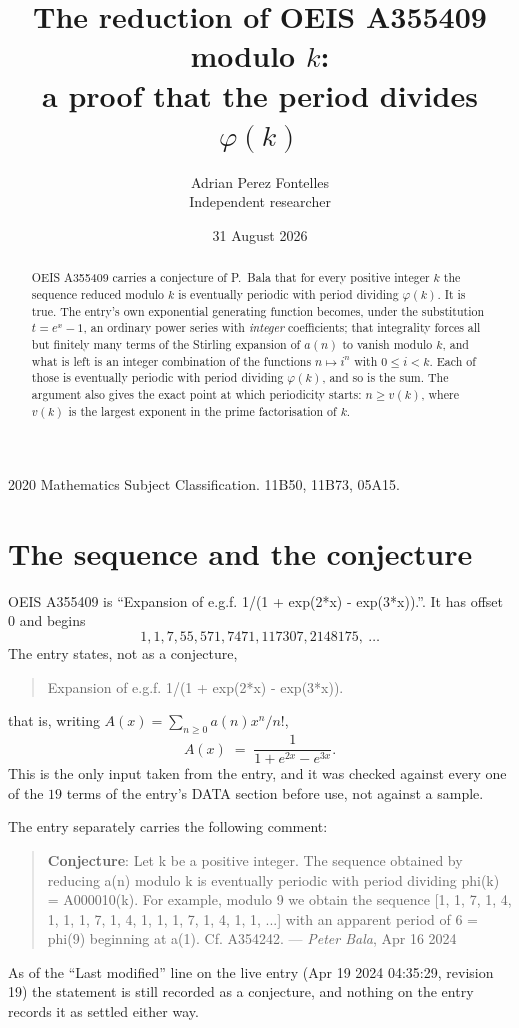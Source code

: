 \documentclass[11pt,a4paper]{article}
\title{The reduction of OEIS A355409 modulo $k$:\\ a proof that the period divides
$\varphi(k)$}
\author{Adrian Perez Fontelles\\ \small Independent researcher}
\date{31 August 2026}
\theoremstyle{plain}
\theoremstyle{definition}
\begin{document}
\maketitle

\begin{abstract}
OEIS A355409 carries a conjecture of P.~Bala that for every positive integer $k$ the
sequence reduced modulo $k$ is eventually periodic with period dividing $\varphi(k)$.
It is true. The entry's own exponential generating function becomes, under the
substitution $t=e^{x}-1$, an ordinary power series with \emph{integer} coefficients;
that integrality forces all but finitely many terms of the Stirling expansion of $a(n)$
to vanish modulo $k$, and what is left is an integer combination of the functions
$n\mapsto i^{n}$ with $0\le i<k$. Each of those is eventually periodic with period
dividing $\varphi(k)$, and so is the sum. The argument also gives the exact point at
which periodicity starts: $n\ge v(k)$, where $v(k)$ is the largest exponent in the
prime factorisation of $k$.
\end{abstract}

\noindent\small 2020 Mathematics Subject Classification. 11B50, 11B73, 05A15.\normalsize

\section{The sequence and the conjecture}

OEIS A355409 is ``Expansion of e.g.f. 1/(1 + exp(2*x) - exp(3*x)).''. It has offset $0$ and begins
\[
1, 1, 7, 55, 571, 7471, 117307, 2148175,\ \dots
\]
The entry states, not as a conjecture,
\begin{quote}\small
Expansion of e.g.f. 1/(1 + exp(2*x) - exp(3*x)).
\end{quote}
that is, writing $A(x)=\sum_{n\ge 0}a(n)x^{n}/n!$,
\begin{equation}\label{eq:egf}
A(x)\;=\;\frac{1}{1+e^{2x}-e^{3x}}.
\end{equation}
This is the only input taken from the entry, and it was checked against every one of the
$19$ terms of the entry's DATA section before use, not against a sample.

The entry separately carries the following comment:
\begin{quote}\small
\textbf{Conjecture}: Let k be a positive integer. The sequence obtained by reducing a(n) modulo k is eventually periodic with period dividing phi(k) = A000010(k). For example, modulo 9 we obtain the sequence [1, 1, 7, 1, 4, 1, 1, 1, 7, 1, 4, 1, 1, 1, 7, 1, 4, 1, 1, ...] with an apparent period of 6 = phi(9) beginning at a(1). Cf. A354242. --- \emph{Peter Bala}, Apr 16 2024
\end{quote}
As of the ``Last modified'' line on the live entry (Apr 19 2024 04:35:29, revision
19) the statement is still recorded as a conjecture, and nothing on the entry
records it as settled either way.
\end{document}
